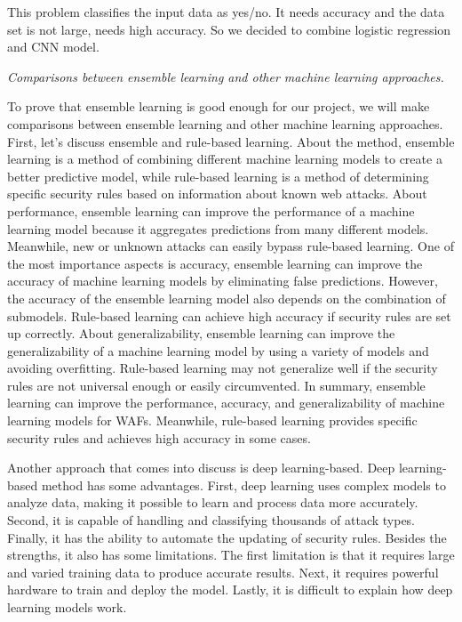 This problem classifies the input data as yes/no. It needs accuracy and the data set is not large, needs high accuracy. So we decided to combine logistic regression and CNN model.

\emph{Comparisons between ensemble learning and other machine learning approaches.} 

To prove that ensemble learning is good enough for our project, we will make comparisons between ensemble learning and other machine learning approaches.
First, let's discuss ensemble and rule-based learning. About the method, ensemble learning is a method of combining different machine learning models to create a better predictive model, while rule-based learning is a method of determining specific security rules based on information about known web attacks. About performance, ensemble learning can improve the performance of a machine learning model because it aggregates predictions from many different models. Meanwhile, new or unknown attacks can easily bypass rule-based learning. One of the most importance aspects is accuracy,
ensemble learning can improve the accuracy of machine learning models by eliminating false predictions. However, the accuracy of the ensemble learning model also depends on the combination of submodels. Rule-based learning can achieve high accuracy if security rules are set up correctly.
About generalizability, ensemble learning can improve the generalizability of a machine learning model by using a variety of models and avoiding overfitting. Rule-based learning may not generalize well if the security rules are not universal enough or easily circumvented. In summary, ensemble learning can improve the performance, accuracy, and generalizability of machine learning models for WAFs. Meanwhile, rule-based learning provides specific security rules and achieves high accuracy in some cases.

Another approach that comes into discuss is deep learning-based. Deep learning-based method has some advantages. First, deep learning uses complex models to analyze data, making it possible to learn and process data more accurately. Second, it is capable of handling and classifying thousands of attack types. Finally, it has the ability to automate the updating of security rules. Besides the strengths, it also has some limitations. The first limitation is that it requires large and varied training data to produce accurate results. Next, it requires powerful hardware to train and deploy the model. Lastly, it is difficult to explain how deep learning models work. 

